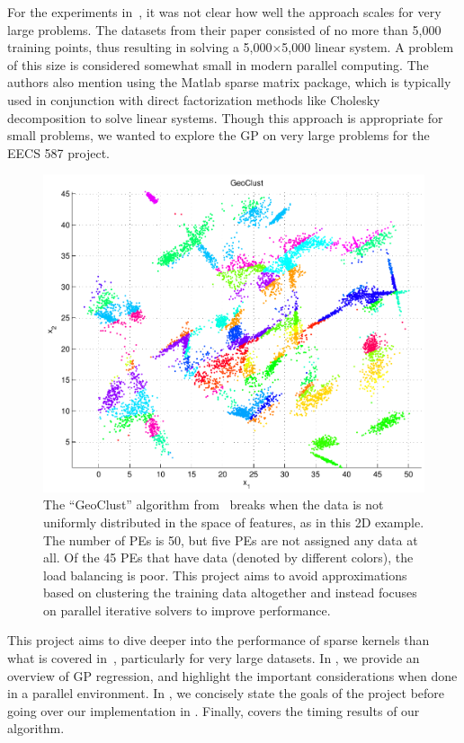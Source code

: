 For the experiments in~\cite{melkumyan2009sparse}, it was not clear how well the approach
scales for very large problems.  The datasets from their paper consisted of no more than
5,000 training points, thus resulting in solving a 5,000$\times$5,000 linear system.  A
problem of this size is considered somewhat small in modern parallel computing.  The
authors also mention using the Matlab sparse matrix package, which is typically used in
conjunction with direct factorization methods like Cholesky decomposition to solve linear
systems.  Though this approach is appropriate for small problems, we wanted to explore the
\ac{GP} on very large problems for the EECS 587 project.

\begin{figure}[t]
  \begin{center}
    \includegraphics[width=.45\textwidth]{figures/geoclust}
    \caption{ {\small The ``GeoClust'' algorithm from~\cite{keane2002data} breaks when the
        data is not uniformly distributed in the space of features, as in this 2D example.
        The number of \acp{PE} is 50, but five \acp{PE} are not assigned any data at all.
        Of the 45 \acp{PE} that have data (denoted by different colors), the load balancing
        is poor. This project aims to avoid approximations based on clustering the
        training data altogether and instead focuses on parallel iterative solvers to
        improve performance.  } }
    \label{fig:geoclust}
  \end{center}
\end{figure}

This project aims to dive deeper into the performance of sparse kernels than what is
covered in~\cite{melkumyan2009sparse}, particularly for very large datasets.  In
, we provide an overview of \ac{GP}
regression, and highlight the important considerations when done in a parallel
environment.  In , we concisely state the goals of
the project before going over our implementation in .  Finally,
 covers the timing results of our algorithm.

